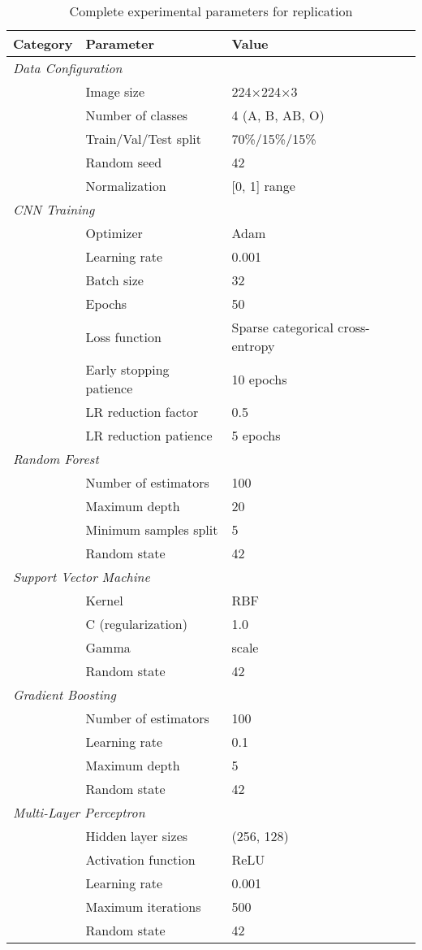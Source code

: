 \documentclass[runningheads]{llncs}
\begin{document}
\begin{table}[h]
\centering
\caption{Complete experimental parameters for replication}
\label{tab:parameters}
\begin{tabular}{@{}lll@{}}
\toprule
\textbf{Category} & \textbf{Parameter} & \textbf{Value} \\
\midrule
\multicolumn{3}{l}{\textit{Data Configuration}} \\
& Image size & 224×224×3 \\
& Number of classes & 4 (A, B, AB, O) \\
& Train/Val/Test split & 70\%/15\%/15\% \\
& Random seed & 42 \\
& Normalization & [0, 1] range \\
\midrule
\multicolumn{3}{l}{\textit{CNN Training}} \\
& Optimizer & Adam \\
& Learning rate & 0.001 \\
& Batch size & 32 \\
& Epochs & 50 \\
& Loss function & Sparse categorical cross-entropy \\
& Early stopping patience & 10 epochs \\
& LR reduction factor & 0.5 \\
& LR reduction patience & 5 epochs \\
\midrule
\multicolumn{3}{l}{\textit{Random Forest}} \\
& Number of estimators & 100 \\
& Maximum depth & 20 \\
& Minimum samples split & 5 \\
& Random state & 42 \\
\midrule
\multicolumn{3}{l}{\textit{Support Vector Machine}} \\
& Kernel & RBF \\
& C (regularization) & 1.0 \\
& Gamma & scale \\
& Random state & 42 \\
\midrule
\multicolumn{3}{l}{\textit{Gradient Boosting}} \\
& Number of estimators & 100 \\
& Learning rate & 0.1 \\
& Maximum depth & 5 \\
& Random state & 42 \\
\midrule
\multicolumn{3}{l}{\textit{Multi-Layer Perceptron}} \\
& Hidden layer sizes & (256, 128) \\
& Activation function & ReLU \\
& Learning rate & 0.001 \\
& Maximum iterations & 500 \\
& Random state & 42 \\
\bottomrule
\end{tabular}
\end{table}
\end{document}
